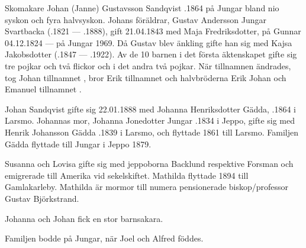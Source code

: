 Skomakare Johan (Janne) Gustavsson Sandqvist .1864 på Jungar bland nio syskon och fyra halvsyskon. Johans föräldrar, Gustav Andersson Jungar Svartbacka (.1821  ---  .1888), gift 21.04.1843 med Maja Fredriksdotter, \textborn på Gunnar 04.12.1824  ---  \textdied på Jungar 1969. Då Gustav blev änkling gifte han sig med Kajsa Jakobsdotter (.1847  ---  .1922). Av de 10 barnen i det första äktenskapet gifte sig tre pojkar och två flickor och i det andra två pojkar. När tillnamnen ändrades, tog Johan tillnamnet , bror Erik tillnamnet  och halvbröderna Erik Johan och Emanuel tillnamnet .


Johan Sandqvist gifte sig 22.01.1888 med Johanna Henriksdotter Gädda, .1864 i Larsmo. Johannas mor, Johanna Jonedotter Jungar .1834 i Jeppo, gifte sig med Henrik Johansson Gädda .1839 i Larsmo, och flyttade 1861 till Larsmo. Familjen Gädda flyttade till Jungar i Jeppo 1879.
\begin{jhchildren}
  \item {}
  \item {}
  \item {}
  \item {}
  \item {}
\end{jhchildren}
Susanna och Lovisa gifte sig med jeppoborna Backlund respektive Forsman och emigrerade till Amerika vid sekelskiftet. Mathilda flyttade 1894 till Gamlakarleby. Mathilda är mormor till numera pensionerade biskop/professor Gustav Björkstrand.

Johanna och Johan fick en stor barnsakara.
\begin{jhchildren}
  \item {}
  \item {}
  \item {}
  \item {}
  \item {}
  \item {}
  \item {}
  \item {}
  \item {}
\end{jhchildren}
Familjen bodde på Jungar, när Joel och Alfred föddes.

